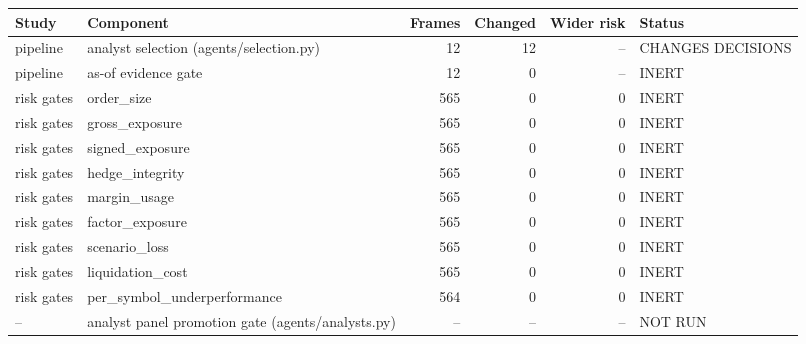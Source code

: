 \begin{tabular}{llrrrl}
\hline
Study & Component & Frames & Changed & Wider risk & Status \\
\hline
pipeline & analyst selection (agents/selection.py) & 12 & 12 & -- & CHANGES DECISIONS \\
pipeline & as-of evidence gate & 12 & 0 & -- & INERT \\
risk gates & order\_size & 565 & 0 & 0 & INERT \\
risk gates & gross\_exposure & 565 & 0 & 0 & INERT \\
risk gates & signed\_exposure & 565 & 0 & 0 & INERT \\
risk gates & hedge\_integrity & 565 & 0 & 0 & INERT \\
risk gates & margin\_usage & 565 & 0 & 0 & INERT \\
risk gates & factor\_exposure & 565 & 0 & 0 & INERT \\
risk gates & scenario\_loss & 565 & 0 & 0 & INERT \\
risk gates & liquidation\_cost & 565 & 0 & 0 & INERT \\
risk gates & per\_symbol\_underperformance & 564 & 0 & 0 & INERT \\
-- & analyst panel promotion gate (agents/analysts.py) & -- & -- & -- & NOT RUN \\
\hline
\end{tabular}
